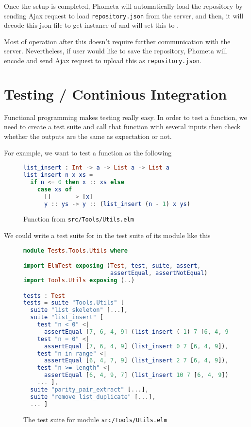 \documentclass[master.tex]{subfiles}
\begin{document}
Once the setup is completed, Phometa will automatically load the repository by
sending Ajax request to load \texttt{repository.json} from the server, and then,
it will decode this json file to get instance of  and will set
this to .

Most of operation after this doesn't require further communication with the
server. Nevertheless, if user would like to save the repository, Phometa will
encode  and send Ajax request to upload this as
\texttt{repository.json}.

\section{Testing / Continious Integration}
Functional programming makes testing really easy. In order to test a function,
we need to create a test suite and call that function with several inputs then
check whether the outputs are the same as expectation or not.

For example, we want to test a function  as the following

\begin{figure}[H]
\begin{framed}
\begin{lstlisting}[language=elm]
list_insert : Int -> a -> List a -> List a
list_insert n x xs =
  if n <= 0 then x :: xs else
    case xs of
      []      -> [x]
      y :: ys -> y :: (list_insert (n - 1) x ys)
\end{lstlisting}
\end{framed}
\caption{Function  from \texttt{src/Tools/Utils.elm}}
\label{fig:implementation-test-src}
\end{figure}

We could write a test suite for  in the test suite of its module like this

\begin{figure}[H]
\begin{framed}
\begin{lstlisting}[language=elm]
module Tests.Tools.Utils where

import ElmTest exposing (Test, test, suite, assert,
                         assertEqual, assertNotEqual)
import Tools.Utils exposing (..)

tests : Test
tests = suite "Tools.Utils" [
  suite "list_skeleton" [...],
  suite "list_insert" [
    test "n < 0" <|
      assertEqual [7, 6, 4, 9] (list_insert (-1) 7 [6, 4, 9]),
    test "n = 0" <|
      assertEqual [7, 6, 4, 9] (list_insert 0 7 [6, 4, 9]),
    test "n in range" <|
      assertEqual [6, 4, 7, 9] (list_insert 2 7 [6, 4, 9]),
    test "n >= length" <|
      assertEqual [6, 4, 9, 7] (list_insert 10 7 [6, 4, 9]),
    ... ],
  suite "parity_pair_extract" [...],
  suite "remove_list_duplicate" [...],
  ... ]
\end{lstlisting}
\end{framed}
\caption{The test suite for module \texttt{src/Tools/Utils.elm}}
\label{fig:implementation-test-test}
\end{figure}
\end{document}
